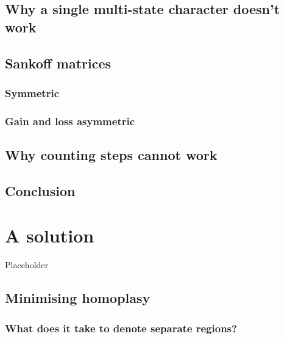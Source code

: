 \documentclass[]{book}
\theoremstyle{definition}
\theoremstyle{definition}
\theoremstyle{definition}
\theoremstyle{remark}
\begin{document}
\hypertarget{why-a-single-multi-state-character-doesnt-work}{%
\section{Why a single multi-state character doesn't
work}\label{why-a-single-multi-state-character-doesnt-work}}

\hypertarget{sankoff-matrices}{%
\section{Sankoff matrices}\label{sankoff-matrices}}

\hypertarget{symmetric}{%
\subsection{Symmetric}\label{symmetric}}

\hypertarget{gain-and-loss-asymmetric}{%
\subsection{Gain and loss asymmetric}\label{gain-and-loss-asymmetric}}

\hypertarget{why-counting-steps-cannot-work}{%
\section{Why counting steps cannot
work}\label{why-counting-steps-cannot-work}}

\hypertarget{conclusion}{%
\section{Conclusion}\label{conclusion}}

\hypertarget{solution}{%
\chapter{A solution}\label{solution}}

Placeholder

\hypertarget{minimising-homoplasy}{%
\section{Minimising homoplasy}\label{minimising-homoplasy}}

\hypertarget{what-does-it-take-to-denote-separate-regions}{%
\subsection{What does it take to denote separate
regions?}\label{what-does-it-take-to-denote-separate-regions}}
\end{document}
